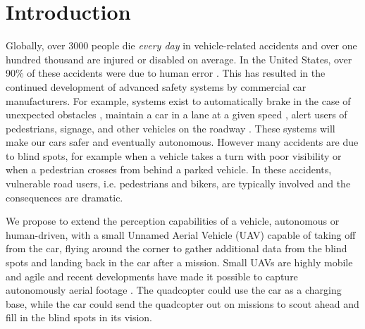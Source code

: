 
\section{Introduction}

Globally, over 3000 people die \emph{every day} \cite{ASIR2016} in vehicle-related accidents and over one hundred thousand are injured or disabled on average.
In the United States, over 90\% of these accidents were due to human error \cite{NHTSA_crash_stats}.
This has resulted in the continued development of advanced safety systems by commercial car manufacturers.
For example, systems exist to automatically brake in the case of unexpected obstacles \cite{Toyota_patent}, maintain a car in a lane at a given speed \cite{bradley2016tesla}, alert users of pedestrians, signage, and other vehicles on the roadway \cite{Dagan_IVS_2004}. These systems will make our cars safer and eventually autonomous.
However many accidents are due to blind spots, for example when a vehicle takes a turn with poor visibility or when a pedestrian crosses from behind a parked vehicle. In these accidents, vulnerable road users, i.e. pedestrians and bikers, are typically involved and the consequences are dramatic.

We propose to extend the perception capabilities of a vehicle, autonomous or human-driven, with a small Unnamed Aerial Vehicle (UAV) capable of taking off from the car, flying around the corner to gather additional data from the blind spots and landing back in the car after a mission. Small UAVs are highly mobile and agile and recent developments have made it possible to capture autonomously aerial footage \cite{naegeli17letters}.
The quadcopter could use the car as a charging base,
while the car could send the quadcopter out on missions to scout ahead and
fill in the blind spots in its vision.


